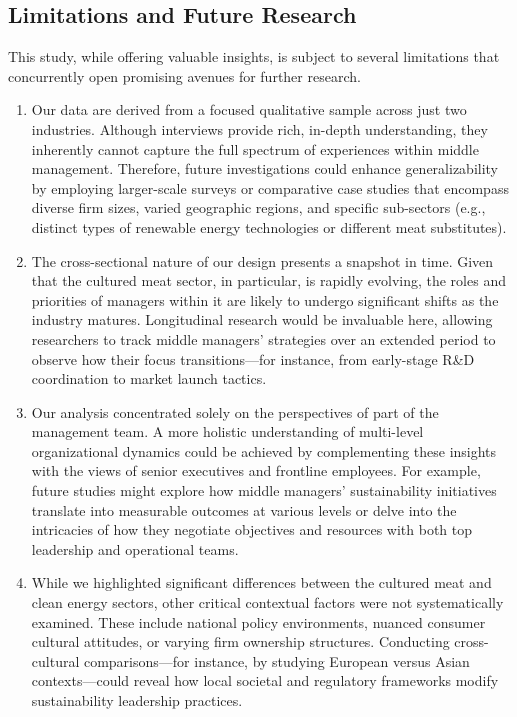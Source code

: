 	\subsection{Limitations and Future Research}
	This study, while offering valuable insights, is subject to several limitations that concurrently open promising avenues for further research.
	\begin{enumerate}
		\item Our data are derived from a focused qualitative sample across just two industries. Although interviews provide rich, in-depth understanding, they inherently cannot capture the full spectrum of experiences within middle management. Therefore, future investigations could enhance generalizability by employing larger-scale surveys or comparative case studies that encompass diverse firm sizes, varied geographic regions, and specific sub-sectors (e.g., distinct types of renewable energy technologies or different meat substitutes).
		
		\item The cross-sectional nature of our design presents a snapshot in time. Given that the cultured meat sector, in particular, is rapidly evolving, the roles and priorities of managers within it are likely to undergo significant shifts as the industry matures. Longitudinal research would be invaluable here, allowing researchers to track middle managers’ strategies over an extended period to observe how their focus transitions—for instance, from early-stage R\&D coordination to market launch tactics.
		
		\item Our analysis concentrated solely on the perspectives of part of the management team. A more holistic understanding of multi-level organizational dynamics could be achieved by complementing these insights with the views of senior executives and frontline employees. For example, future studies might explore how middle managers’ sustainability initiatives translate into measurable outcomes at various levels or delve into the intricacies of how they negotiate objectives and resources with both top leadership and operational teams.
		
		\item While we highlighted significant differences between the cultured meat and clean energy sectors, other critical contextual factors were not systematically examined. These include national policy environments, nuanced consumer cultural attitudes, or varying firm ownership structures. Conducting cross-cultural comparisons—for instance, by studying European versus Asian contexts—could reveal how local societal and regulatory frameworks modify sustainability leadership practices.
	\end{enumerate}
	
